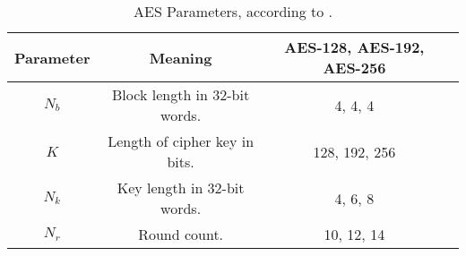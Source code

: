 \begin{table}[!hbtp]
    \centering
    \begin{tabular}{|c|c|c|c|}
        \hline
        Parameter & Meaning & AES-128, AES-192, AES-256\\
        \hline
        \(N_b\) & Block length in 32-bit words. & 4, 4, 4\\
        \(K\) & Length of cipher key in bits. & 128, 192, 256\\
        \(N_k\) & Key length in 32-bit words. & 4, 6, 8\\
        \(N_r\) & Round count. & 10, 12, 14\\
        \hline
    \end{tabular}
    \caption{AES Parameters, according to \cite[pp. 13-14]{Dworkin2001}.}
    \label{aes_parameters}
\end{table}

